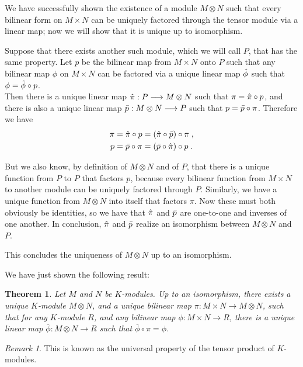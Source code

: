 \documentclass{report}
\newtheorem{thrm}{Theorem}
\theoremstyle{definition}
\theoremstyle{remark}
\newtheorem{remark}{Remark}
\begin{document}
    We have successfully shown the existence of a module $M\otimes N$ such that every bilinear form on $M \times N$ can be uniquely factored through the tensor module via a linear map; now we will show that it is unique up to isomorphism. 
    
    Suppose that there exists another such module, which we will call $P$, that has the same property. Let $p$ be the bilinear map from $M \times N$ onto $P$ such that any bilinear map $\phi$ on $M \times N$ can be factored via a unique linear map $\Hat{\phi}$ such that $\phi = \Hat{\phi}\circ p$.
    \\
    Then there is a unique linear map $\Hat{\pi} : P \longrightarrow M \otimes N$ such that $\pi = \Hat{\pi}\circ p$, and there is also a unique linear map $\Bar{p}: M \otimes N \longrightarrow P $ such that $p = \Bar{p} \circ \pi$. Therefore we have
    \begin{gather*}
         \pi = \Hat{\pi}\circ p = (\Hat{\pi} \circ \Bar{p}) \circ \pi\;, \\
        p = \Bar{p} \circ \pi =  (\Bar{p} \circ \Hat{\pi}) \circ p\;.
         \end{gather*}
    
    But we also know, by definition of $M \otimes N$ and of $P$, that there is a unique function from $P$ to $P$ that factors $p$, because every bilinear function from $M \times N$ to another module can be uniquely factored through $P$. Similarly, we have a unique function from $M \otimes N$ into itself that factors $\pi$. Now these must both obviously be identities, so we have that $\Hat{\pi}$ and $\Bar{p}$ are one-to-one and inverses of one another. In conclusion, $\Hat{\pi}$ and $\Bar{p}$ realize an isomorphism between $M \otimes N$ and $P$.
    
    This concludes the uniqueness of $M \otimes N$ up to an isomorphism.


 \bigskip
 We have just shown the following result: 
 
 \begin{thrm} \label{prod tens mods}
         Let $M$ and $N$ be $K$-modules. Up to an isomorphism, there exists a unique $K$-module $M \otimes N$, and a unique bilinear map $\pi: M\times N \to M\otimes N$, such that for any $K$-module $R$, and any bilinear map $\phi: M \times N \to R$, there is a unique linear map $\overline{\phi}: M \otimes N \to R$ such that $\overline{\phi} \circ \pi = \phi$.
 \end{thrm}


\begin{remark}
This is known as the universal property of the tensor product of $K$-modules. 
\end{remark}
\end{document}
